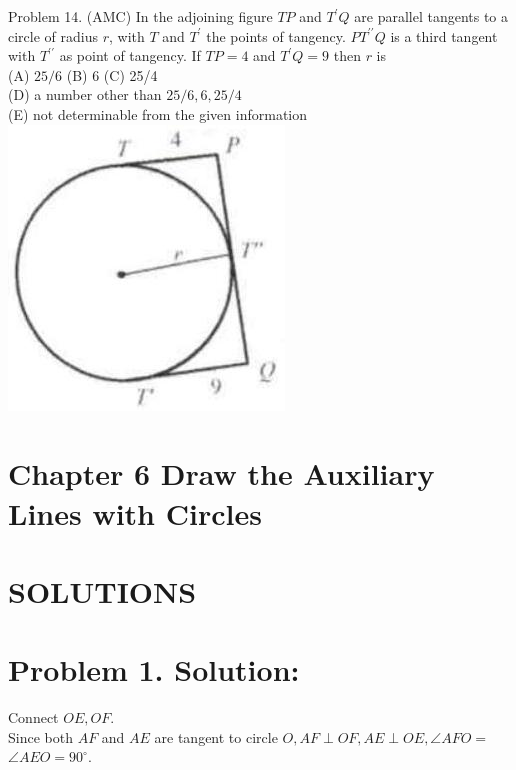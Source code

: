 \documentclass[10pt]{article}
\begin{document}
Problem 14. (AMC) In the adjoining figure \(T P\) and \(T^{\prime} Q\) are parallel tangents to a circle of radius \(r\), with \(T\) and \(T^{\prime}\) the points of tangency. \(P T^{\prime \prime} Q\) is a third tangent with \(T^{\prime \prime}\) as point of tangency. If \(T P=4\) and \(T^{\prime} Q=9\) then \(r\) is\\
(A) \(25 / 6\) (B) 6 (C) 25/4\\
(D) a number other than \(25 / 6,6,25 / 4\)\\
(E) not determinable from the given information\\
\includegraphics[max width=\textwidth, center]{2025_04_17_97bc1f7e44d93c271a88g-156(2)}

\section*{Chapter 6 Draw the Auxiliary Lines with Circles}
\section*{SOLUTIONS}
\section*{Problem 1. Solution:}
Connect \(O E, O F\).\\
Since both \(A F\) and \(A E\) are tangent to circle \(O, A F \perp O F, A E \perp O E, \angle A F O=\) \(\angle A E O=90^{\circ}\).
\end{document}
